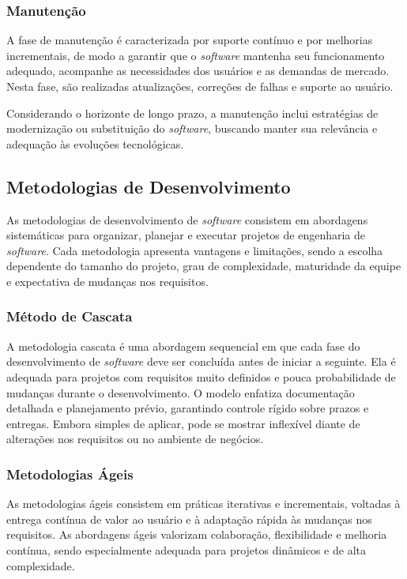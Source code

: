 \subsubsection{Manutenção}

A fase de manutenção é caracterizada por suporte contínuo e por melhorias incrementais, de modo a garantir que o \textit{software} mantenha seu funcionamento adequado, acompanhe as necessidades dos usuários e as demandas de mercado. Nesta fase, são realizadas atualizações, correções de falhas e suporte ao usuário.

Considerando o horizonte de longo prazo, a manutenção inclui estratégias de modernização ou substituição do \textit{software}, buscando manter sua relevância e adequação às evoluções tecnológicas.

\subsection{Metodologias de Desenvolvimento}

As metodologias de desenvolvimento de \textit{software} consistem em abordagens sistemáticas para organizar, planejar e executar projetos de engenharia de \textit{software}. Cada metodologia apresenta vantagens e limitações, sendo a escolha dependente do tamanho do projeto, grau de complexidade, maturidade da equipe e expectativa de mudanças nos requisitos.

\subsubsection{Método de Cascata}

A metodologia cascata é uma abordagem sequencial em que cada fase do desenvolvimento de \textit{software} deve ser concluída antes de iniciar a seguinte. Ela é adequada para projetos com requisitos muito definidos e pouca probabilidade de mudanças durante o desenvolvimento. O modelo enfatiza documentação detalhada e planejamento prévio, garantindo controle rígido sobre prazos e entregas. Embora simples de aplicar, pode se mostrar inflexível diante de alterações nos requisitos ou no ambiente de negócios.

\subsubsection{Metodologias Ágeis}

As metodologias ágeis consistem em práticas iterativas e incrementais, voltadas à entrega contínua de valor ao usuário e à adaptação rápida às mudanças nos requisitos. As abordagens ágeis valorizam colaboração, flexibilidade e melhoria contínua, sendo especialmente adequada para projetos dinâmicos e de alta complexidade. 

